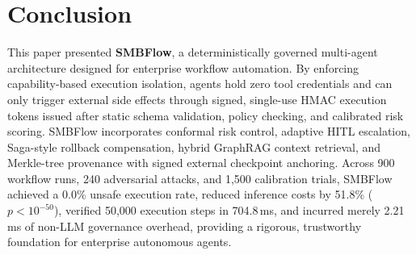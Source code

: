 \documentclass[conference]{IEEEtran}
\begin{document}
\section{Conclusion}

This paper presented \textbf{SMBFlow}, a deterministically governed multi-agent architecture designed for enterprise workflow automation. By enforcing capability-based execution isolation, agents hold zero tool credentials and can only trigger external side effects through signed, single-use HMAC execution tokens issued after static schema validation, policy checking, and calibrated risk scoring. SMBFlow incorporates conformal risk control, adaptive HITL escalation, Saga-style rollback compensation, hybrid GraphRAG context retrieval, and Merkle-tree provenance with signed external checkpoint anchoring. Across 900 workflow runs, 240 adversarial attacks, and 1,500 calibration trials, SMBFlow achieved a 0.0\% unsafe execution rate, reduced inference costs by 51.8\% ($p < 10^{-50}$), verified 50,000 execution steps in 704.8\,ms, and incurred merely 2.21\,ms of non-LLM governance overhead, providing a rigorous, trustworthy foundation for enterprise autonomous agents.

\balance

{\fontsize{6.8pt}{7.8pt}\selectfont
}
\end{document}
